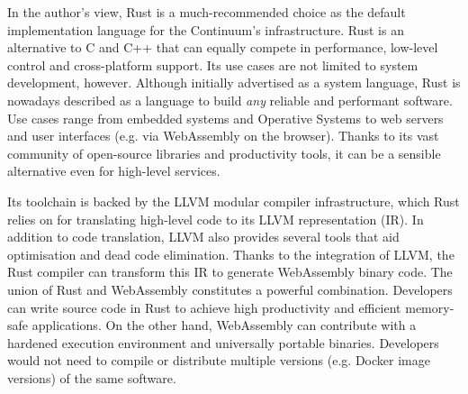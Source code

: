 In the author's view, Rust is a much-recommended choice as the default implementation language for the Continuum's infrastructure. Rust is an alternative to C and C++ that can equally compete in performance, low-level control and cross-platform support. Its use cases are not limited to system development, however. Although initially advertised as a system language, Rust is nowadays described as a language to build \emph{any} reliable and performant software. Use cases range from embedded systems and Operative Systems to web servers and user interfaces (e.g. via WebAssembly on the browser). Thanks to its vast community of open-source libraries and productivity tools, it can be a sensible alternative even for high-level services.

Its toolchain is backed by the LLVM modular compiler infrastructure, which Rust relies on for translating high-level code to its LLVM representation (IR). In addition to code translation, LLVM also provides several tools that aid optimisation and dead code elimination. Thanks to the integration of LLVM, the Rust compiler can transform this IR to generate WebAssembly binary code. The union of Rust and WebAssembly constitutes a powerful combination. Developers can write source code in Rust to achieve high productivity and efficient memory-safe applications. On the other hand, WebAssembly can contribute with a hardened execution environment and universally portable binaries. Developers would not need to compile or distribute multiple versions (e.g. Docker image versions) of the same software. 




